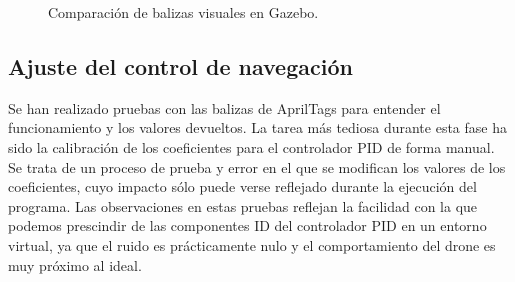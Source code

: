 \begin{figure}[H]
	\begin{center}
		\centering
		\hspace{10mm}
		\hspace{10mm}
		\caption{Comparación de balizas visuales en Gazebo.}
		\label{fig:compararBalizasGazebo}	
	\end{center}
\end{figure}


\subsection{Ajuste del control de navegación}

Se han realizado pruebas con las balizas de AprilTags para entender el funcionamiento y los valores devueltos. La tarea más tediosa durante esta fase ha sido la calibración de los coeficientes para el controlador PID de forma manual. Se trata de un proceso de prueba y error en el que se modifican los valores de los coeficientes, cuyo impacto sólo puede verse reflejado durante la ejecución del programa. Las observaciones en estas pruebas reflejan la facilidad con la que podemos prescindir de las componentes ID del controlador PID en un entorno virtual, ya que el ruido es prácticamente nulo y el comportamiento del drone es muy próximo al ideal.

